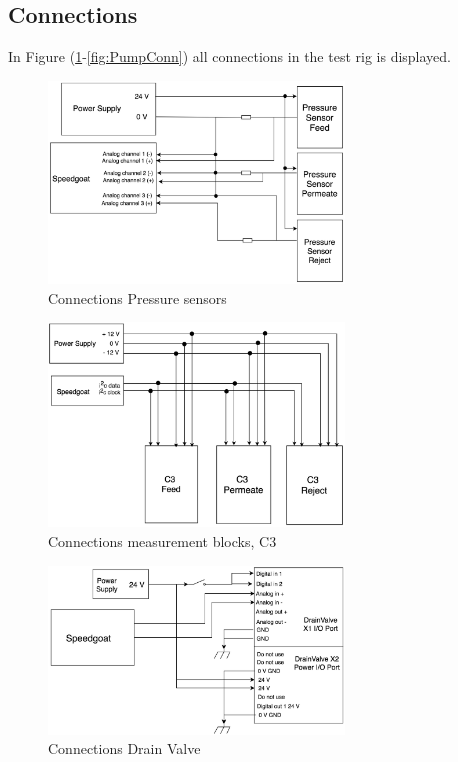 \subsection{Connections}
In Figure (\ref{fig:PressConn}-\ref{fig:PumpConn}) all connections in the test rig is displayed.


\begin{figure}[h]
    \centering
    \includegraphics[width=0.7\textwidth]{PressConn}
    \caption{Connections Pressure sensors}
    \label{fig:PressConn}
\end{figure}

\begin{figure}[h]
    \centering
    \includegraphics[width=0.7\textwidth]{C3Conn}
    \caption{Connections measurement blocks, C3}
    \label{fig:C3Conn}
\end{figure}

\begin{figure}[h]
    \centering
    \includegraphics[width=0.7\textwidth]{ValveConn}
    \caption{Connections Drain Valve}
    \label{fig:ValveConn}
\end{figure}

